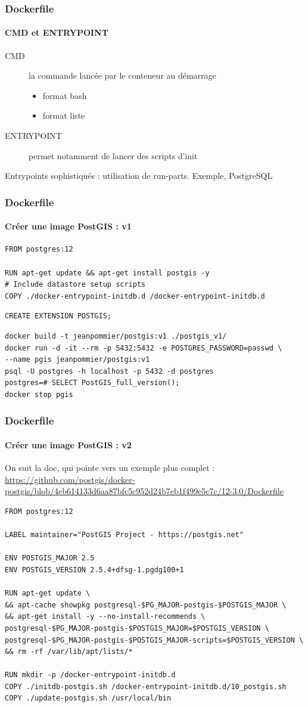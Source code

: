 \documentclass[11pt]{beamer}
\begin{document}
\begin{frame}[fragile]
\frametitle{Dockerfile}
\framesubtitle{CMD et ENTRYPOINT}
\begin{description}
\item[CMD] la commande lancée par le conteneur au démarrage
\begin{itemize}
	\item format bash
	\item format liste
\end{itemize}
\item[ENTRYPOINT] permet notamment de lancer des scripts d'init
\end{description}

Entrypoints sophistiqués : utilisation de run-parts. Exemple, PostgreSQL
\end{frame}

\begin{frame}[fragile]
\frametitle{Dockerfile}
\framesubtitle{Créer une image PostGIS : v1}
\begin{lstlisting}[title=Dockerfile]
FROM postgres:12

RUN apt-get update && apt-get install postgis -y
# Include datastore setup scripts
COPY ./docker-entrypoint-initdb.d /docker-entrypoint-initdb.d
\end{lstlisting}

\begin{lstlisting}[title=fichier entrypoint]
CREATE EXTENSION POSTGIS;
\end{lstlisting}
\begin{lstlisting}[title=console]
docker build -t jeanpommier/postgis:v1 ./postgis_v1/
docker run -d -it --rm -p 5432:5432 -e POSTGRES_PASSWORD=passwd \
--name pgis jeanpommier/postgis:v1
psql -U postgres -h localhost -p 5432 -d postgres
postgres=# SELECT PostGIS_full_version();
docker stop pgis
\end{lstlisting}
\end{frame}

\begin{frame}[fragile]
\frametitle{Dockerfile}
\framesubtitle{Créer une image PostGIS : v2}
On suit la doc, qui pointe vers un exemple plus complet : 
\url{https://github.com/postgis/docker-postgis/blob/4eb614133d6aa87bfc5c952d24b7eb1f499e5c7c/12-3.0/Dockerfile}
\begin{lstlisting}[basicstyle=\ttfamily\tiny]
FROM postgres:12

LABEL maintainer="PostGIS Project - https://postgis.net"

ENV POSTGIS_MAJOR 2.5
ENV POSTGIS_VERSION 2.5.4+dfsg-1.pgdg100+1

RUN apt-get update \
&& apt-cache showpkg postgresql-$PG_MAJOR-postgis-$POSTGIS_MAJOR \
&& apt-get install -y --no-install-recommends \
postgresql-$PG_MAJOR-postgis-$POSTGIS_MAJOR=$POSTGIS_VERSION \
postgresql-$PG_MAJOR-postgis-$POSTGIS_MAJOR-scripts=$POSTGIS_VERSION \
&& rm -rf /var/lib/apt/lists/*

RUN mkdir -p /docker-entrypoint-initdb.d
COPY ./initdb-postgis.sh /docker-entrypoint-initdb.d/10_postgis.sh
COPY ./update-postgis.sh /usr/local/bin
\end{lstlisting}
\end{frame}
\end{document}
